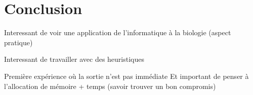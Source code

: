 
\section{Conclusion}

Interessant de voir une application de l'informatique à la biologie (aspect pratique)

Interessant de travailler avec des heuristiques 

Première expérience où la sortie n'est pas immédiate 
Et important de penser à l'allocation de mémoire + temps (savoir trouver un bon compromis)